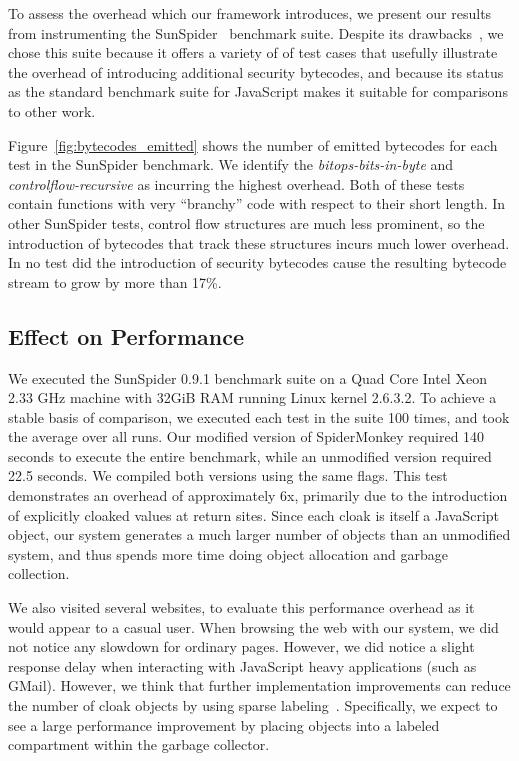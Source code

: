 \documentclass{llncs}
\begin{document}
To assess the overhead which our framework introduces, we present our results from instrumenting the SunSpider~\cite{sunspider} benchmark suite.
Despite its drawbacks~\cite{jsmeter}, we chose this suite because it offers a variety of of test cases that usefully illustrate the overhead of introducing additional security bytecodes, and because its status as the standard benchmark suite for JavaScript makes it suitable for comparisons to other work.

Figure~\ref{fig:bytecodes_emitted} shows the number of emitted bytecodes for each test in the SunSpider benchmark.
We identify the \textit{bitops-bits-in-byte} and \textit{controlflow-recursive} as incurring the highest overhead.
Both of these tests contain functions with very ``branchy'' code with respect to their short length.
In other SunSpider tests, control flow structures are much less prominent, so the introduction of bytecodes that track these structures incurs much lower overhead.
In no test did the introduction of security bytecodes cause the resulting bytecode stream to grow by more than 17\%.

\subsection{Effect on Performance}
We executed the SunSpider 0.9.1 benchmark suite on a Quad Core Intel Xeon 2.33 GHz machine with 32GiB RAM running Linux kernel 2.6.3.2.
To achieve a stable basis of comparison, we executed each test in the suite 100 times, and took the average over all runs.
Our modified version of SpiderMonkey required 140 seconds to execute the entire benchmark, while an unmodified version required 22.5 seconds.
We compiled both versions using the same flags.
This test demonstrates an overhead of approximately 6x, primarily due to the introduction of explicitly cloaked values at return sites.
Since each cloak is itself a JavaScript object, our system generates a much larger number of objects than an unmodified system, and thus spends more time doing object allocation and garbage collection.

We also visited several websites, to evaluate this performance overhead as it would appear to a casual user.
When browsing the web with our system, we did not notice any slowdown for ordinary pages.
However, we did notice a slight response delay when interacting with JavaScript heavy applications (such as GMail).
However, we think that further implementation improvements can reduce the number of cloak objects by using sparse labeling~\cite{1554353,1814220}.
Specifically, we expect to see a large performance improvement by placing objects into a labeled compartment within the garbage collector.
\end{document}
